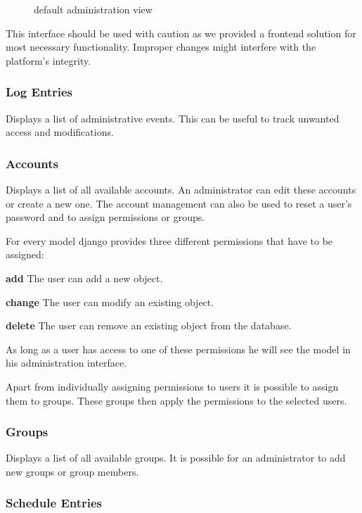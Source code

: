 \begin{figure}[htbp]
\centering
{}
\caption{default administration view}
\end{figure}

This interface should be used with caution as we provided a frontend
solution for most necessary functionality. Improper changes might
interfere with the platform's integrity.

\subsubsection{Log Entries}\label{log-entries}

Displays a list of administrative events. This can be useful to track
unwanted access and modifications.

\subsubsection{Accounts}\label{accounts}

Displays a list of all available accounts. An administrator can edit
these accounts or create a new one. The account management can also be
used to reset a user's password and to assign permissions or groups.

For every model django provides three different permissions that have to
be assigned:

\textbf{add} The user can add a new object.

\textbf{change} The user can modify an existing object.

\textbf{delete} The user can remove an existing object from the
database.

As long as a user has access to one of these permissions he will see the
model in his administration interface.

Apart from individually assigning permissions to users it is possible to
assign them to groups. These groups then apply the permissions to the
selected users.

\subsubsection{Groups}\label{groups}

Displays a list of all available groups. It is possible for an
administrator to add new groups or group members.

\subsubsection{Schedule Entries}\label{schedule-entries}

